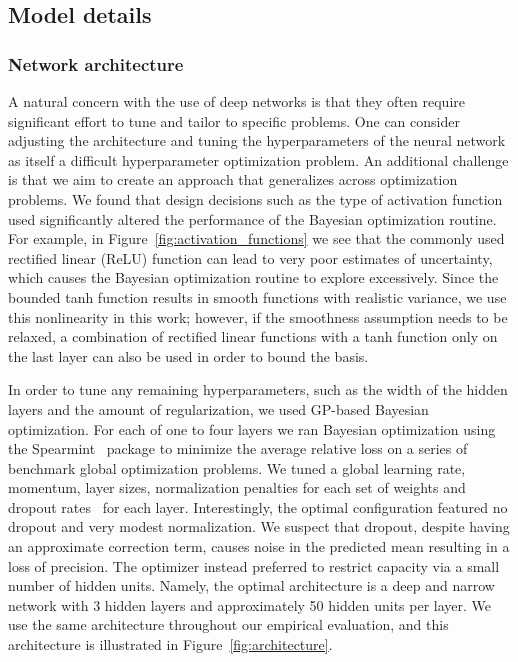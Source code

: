 \documentclass{article}
\begin{document}
\subsection{Model details}

\subsubsection{Network architecture}
\label{network}
A natural concern with the use of deep networks is that they often require significant effort to tune and tailor to specific problems. One can consider adjusting the architecture and tuning the hyperparameters of the neural network as itself a difficult hyperparameter optimization problem.  An additional challenge is that we aim to create an approach that generalizes across optimization problems.  We found that design decisions such as the type of activation function used significantly altered the performance of the Bayesian optimization routine.  For example, in Figure~\ref{fig:activation_functions} we see that the commonly used rectified linear (ReLU) function can lead to very poor estimates of uncertainty, which causes the Bayesian optimization routine to explore excessively.  Since the bounded tanh function results in smooth functions with realistic variance, we use this nonlinearity in this work; however, if the smoothness assumption needs to be relaxed, a combination of rectified linear functions with a tanh function only on the last layer can also be used in order to bound the basis.

In order to tune any remaining hyperparameters, such as the width of the hidden layers and the amount of regularization, we used GP-based Bayesian optimization.  For each of one to four layers we ran Bayesian optimization using the Spearmint~\cite{snoek-etal-2014a} package to minimize the average relative loss on a series of benchmark global optimization problems.  We tuned a global learning rate, momentum, layer sizes,  normalization penalties for each set of weights and dropout rates~\cite{hinton2012improving} for each layer.  Interestingly, the optimal configuration featured no dropout and very modest  normalization.  We suspect that dropout, despite having an approximate correction term, causes noise in the predicted mean resulting in a loss of precision.  The optimizer instead preferred to restrict capacity via a small number of hidden units. Namely, the optimal architecture is a deep and narrow network with 3 hidden layers and approximately 50 hidden units per layer.  We use the same architecture throughout our empirical evaluation, and this architecture is illustrated in Figure~\ref{fig:architecture}.
\end{document}
